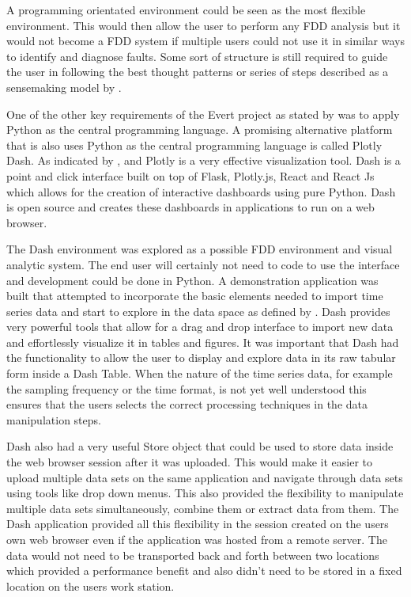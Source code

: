 A programming orientated environment could be seen as the most flexible environment. This would then allow the user to perform any FDD analysis but it would not become a FDD system if multiple users could not use it in similar ways to identify and diagnose faults. Some sort of structure is still required to guide the user in following the best thought patterns or series of steps described as a sensemaking model by \cite{pirolli2005sensemaking}.

One of the other key requirements of the Evert project as stated by \cite{Herbst2017} was to apply Python as the central programming language. A promising alternative platform that is also uses Python as the central programming language is called Plotly Dash. As indicated by \cite{ali2016big}, \cite{caldarola2017big} and \cite{Herbst2017} Plotly is a very effective visualization tool. Dash is a point and click interface built on top of Flask, Plotly.js, React and React Js which allows for the creation of interactive dashboards using pure Python. Dash is open source and creates these dashboards in applications to run on a web browser.

The Dash environment was explored as a possible FDD environment and visual analytic system. The end user will certainly not need to code to use the interface and development could be done in Python. A demonstration application was built that attempted to incorporate the basic elements needed to import time series data and start to explore in the data space as defined by \cite{venkatasubramanian2003review}. Dash provides very powerful tools that allow for a drag and drop interface to import new data and effortlessly visualize it in tables and figures. It was important that Dash had the functionality to allow the user to display and explore data in its raw tabular form inside a Dash Table. When the nature of the time series data, for example the sampling frequency or the time format, is not yet well understood this ensures that the users selects the correct processing techniques in the data manipulation steps.

Dash also had a very useful Store object that could be used to store data inside the web browser session after it was uploaded. This would make it easier to upload multiple data sets on the same application and navigate through data sets using tools like drop down menus. This also provided the flexibility to manipulate multiple data sets simultaneously, combine them or extract data from them. The Dash application provided all this flexibility in the session created on the users own web browser even if the application was hosted from a remote server. The data would not need to be transported back and forth between two locations which provided a performance benefit and also didn't need to be stored in a fixed location on the users work station.

